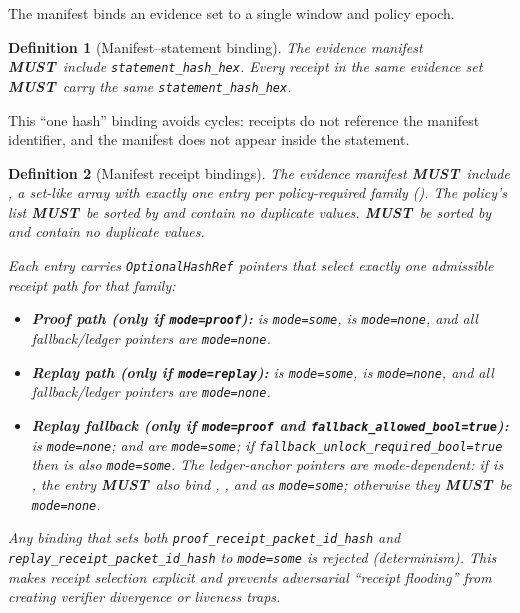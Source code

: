 \documentclass[11pt]{article}
\newcommand{\MUST}{\textbf{MUST}}
\newtheorem{definition}{Definition}
\begin{document}
The manifest binds an evidence set to a single window and policy epoch.

\begin{definition}[Manifest--statement binding]
The evidence manifest \MUST\ include \texttt{statement\_hash\_hex}. Every receipt in the same evidence set \MUST\ carry the same \texttt{statement\_hash\_hex}.
\end{definition}

This ``one hash'' binding avoids cycles: receipts do not reference the manifest identifier, and the manifest does not appear inside the statement.

\begin{definition}[Manifest receipt bindings]\label{def:manifest-bindings}
The evidence manifest \MUST\ include , a set-like array with exactly one entry per policy-required family ().
The policy's  list \MUST\ be sorted by  and contain no duplicate  values.
 \MUST\ be sorted by  and contain no duplicate  values.

Each entry carries \texttt{OptionalHashRef} pointers that select exactly one admissible receipt path for that family:
\begin{itemize}[leftmargin=1.2em]
  \item \textbf{Proof path (only if \texttt{mode=proof}):}  is \texttt{mode=some},  is \texttt{mode=none}, and all fallback/ledger pointers are \texttt{mode=none}.
  \item \textbf{Replay path (only if \texttt{mode=replay}):}  is \texttt{mode=some},  is \texttt{mode=none}, and all fallback/ledger pointers are \texttt{mode=none}.
  \item \textbf{Replay fallback (only if \texttt{mode=proof} and \texttt{fallback\_allowed\_bool=true}):}  is \texttt{mode=none};  and  are \texttt{mode=some}; if \texttt{fallback\_unlock\_required\_bool=true} then  is also \texttt{mode=some}.
  The ledger-anchor pointers are mode-dependent: if  is , the entry \MUST\ also bind , , and  as \texttt{mode=some}; otherwise they \MUST\ be \texttt{mode=none}.
\end{itemize}
Any binding that sets both \texttt{proof\_receipt\_packet\_id\_hash} and \texttt{replay\_receipt\_packet\_id\_hash} to \texttt{mode=some} is rejected (determinism).
This makes receipt selection explicit and prevents adversarial ``receipt flooding'' from creating verifier divergence or liveness traps.
\end{definition}
\end{document}
